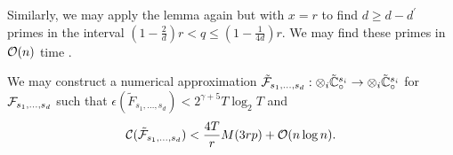 Similarly, we may apply the lemma again but with $x = r$ to find $d \ge d - d^\prime$ primes in the interval $(1 - \frac{2}{d})r < q \le (1 - \frac{1}{4d})r$. We may find these primes in $\mathcal O(n)$ time \cite{nlogn}.



\begin{proposition}
    We may construct a numerical approximation $\tilde{\mathcal F}_{s_1, \ldots, s_d}: \otimes_i \tilde{{\mathbb C}}_\circ^{s_i} \to \otimes_i \tilde{{\mathbb C}}_\circ^{s_i}$ for $\mathcal F_{s_1, \ldots, s_d}$ such that $\epsilon(\tilde{F}_{s_1, \ldots, s_d}) < 2^{\gamma + 5} T \log_2 T$ and
    \[
        \mathcal C(\tilde{\mathcal F}_{s_1, \ldots, s_d}) < \frac{4T}{r} M(3rp) + \mathcal O(n \log n).
    \]
\end{proposition}

